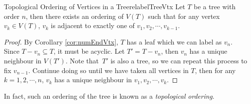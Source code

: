\documentclass[math]{amznotes}
\theoremstyle{remark}
\begin{document}
\begin{probox}{Topological Ordering of Vertices in a Tree}{relabelTreeVtx}
    Let $T$ be a tree with order $n$, then there exists an ordering of $V(T)$ such that for any vertex~$v_k \in V(T)$, $v_k$ is adjacent to exactly one of $v_1, v_2, \cdots, v_{k - 1}$.
    \tcblower
    \begin{proof}
        By Corollary \ref{cor:numEndVtx}, $T$ has a leaf which we can label as $v_n$. Since $T - v_n \subseteq T$, it must be acyclic. Let $T' = T - v_n$, then $v_n$ has a unique neighbour in $V(T')$. Note that~$T'$ is also a tree, so we can repeat this process to fix $v_{n - 1}$. Continue doing so until we have taken all vertices in $T$, then for any $k = 1, 2, \cdots, n$, $v_k$ has a unique neighbour in $v_1, v_2, \cdots, v_k$.
    \end{proof}
\end{probox}
In fact, such an ordering of the tree is known as a \textit{topological ordering}. 
\end{document}
